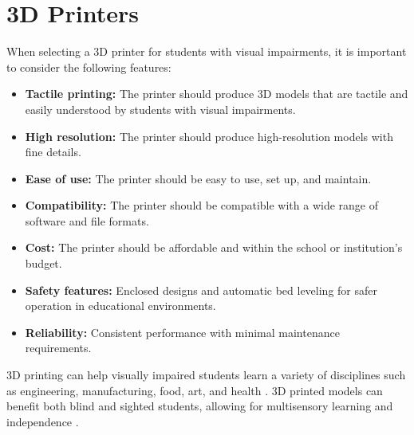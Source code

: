 \section{3D Printers}\label{ch5:sec:3d-printers}
When selecting a 3D printer for students with visual impairments, it is important to consider the following features:
\begin{itemize}
	\item \textbf{Tactile printing:} The printer should produce 3D models that are tactile and easily understood by students with visual impairments.
	\item \textbf{High resolution:} The printer should produce high-resolution models with fine details.
	\item \textbf{Ease of use:} The printer should be easy to use, set up, and maintain.
	\item \textbf{Compatibility:} The printer should be compatible with a wide range of software and file formats.
	\item \textbf{Cost:} The printer should be affordable and within the school or institution's budget.
	\item \textbf{Safety features:} Enclosed designs and automatic bed leveling for safer operation in educational environments.
	\item \textbf{Reliability:} Consistent performance with minimal maintenance requirements.
\end{itemize}

3D printing can help visually impaired students learn a variety of disciplines such as engineering, manufacturing, food, art, and health \supercite{Karbowski2020}. 3D printed models can benefit both blind and sighted students, allowing for multisensory learning and independence \supercite{MatterHackers2017}.

